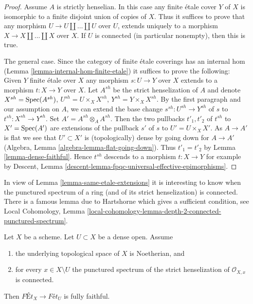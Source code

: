 \begin{proof}
Assume $A$ is strictly henselian. In this case any finite \'etale
cover $Y$ of $X$ is isomorphic to a finite disjoint union of
copies of $X$. Thus it suffices to prove that any morphism
$U \to U \amalg \ldots \amalg U$ over $U$, extends uniquely to a morphism
$X \to X \amalg \ldots \amalg X$ over $X$.
If $U$ is connected (in particular nonempty), then this is true.

\medskip\noindent
The general case. Since the category of finite \'etale coverings has an
internal hom (Lemma \ref{lemma-internal-hom-finite-etale})
it suffices to prove the following: Given $Y$ finite \'etale over $X$
any morphism $s : U \to Y$ over $X$ extends to a morphism $t : X \to Y$
over $X$. Let $A^{sh}$ be the strict henselization of $A$ and denote
$X^{sh} = \mathop{\mathrm{Spec}}(A^{sh})$, $U^{sh} = U \times_X X^{sh}$,
$Y^{sh} = Y \times_X X^{sh}$. By the first paragraph and our assumption
on $A$, we can extend the base change $s^{sh} : U^{sh} \to Y^{sh}$ of $s$ to
$t^{sh} : X^{sh} \to Y^{sh}$. Set $A' = A^{sh} \otimes_A A^{sh}$.
Then the two pullbacks $t'_1, t'_2$ of $t^{sh}$ to $X' = \mathop{\mathrm{Spec}}(A')$
are extensions of the pullback $s'$ of $s$ to $U' = U \times_X X'$.
As $A \to A'$ is flat we see that $U' \subset X'$ is (topologically) dense
by going down for $A \to A'$
(Algebra, Lemma \ref{algebra-lemma-flat-going-down}). Thus
$t'_1 = t'_2$ by Lemma \ref{lemma-dense-faithful}.
Hence $t^{sh}$ descends to a morphism $t : X \to Y$
for example by
Descent, Lemma \ref{descent-lemma-fpqc-universal-effective-epimorphisms}.
\end{proof}

\noindent
In view of Lemma \ref{lemma-same-etale-extensions}
it is interesting to know when the
punctured spectrum of a ring (and of its strict henselization)
is connected. There is a famous lemma due to Hartshorne
which gives a sufficient condition, see
Local Cohomology, Lemma
\ref{local-cohomology-lemma-depth-2-connected-punctured-spectrum}.

\begin{lemma}
\label{lemma-quasi-compact-dense-open-connected-at-infinity-Noetherian}
Let $X$ be a scheme. Let $U \subset X$ be a dense open. Assume
\begin{enumerate}
\item the underlying topological space of $X$ is Noetherian, and
\item for every $x \in X \setminus U$ the punctured spectrum of the
strict henselization of $\mathcal{O}_{X, x}$ is connected.
\end{enumerate}
Then $\textit{F\'Et}_X \to \textit{F\'et}_U$ is fully faithful.
\end{lemma}

